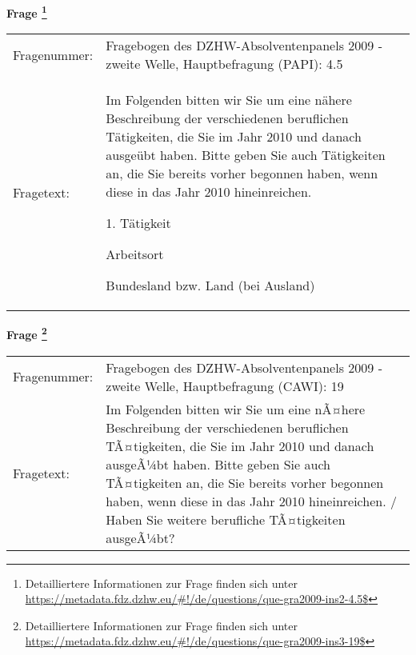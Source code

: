 				\vspace*{0.5cm}
                \noindent\textbf{Frage
	                \footnote{Detailliertere Informationen zur Frage finden sich unter
		              \url{https://metadata.fdz.dzhw.eu/\#!/de/questions/que-gra2009-ins2-4.5$}}}\\
				\begin{tabularx}{\hsize}{@{}lX}
					Fragenummer: &
					  Fragebogen des DZHW-Absolventenpanels 2009 - zweite Welle, Hauptbefragung (PAPI):
					  4.5
 \\
					Fragetext: & Im Folgenden bitten wir Sie um eine nähere Beschreibung der verschiedenen beruflichen Tätigkeiten, die Sie im Jahr 2010 und danach ausgeübt haben. Bitte geben Sie auch Tätigkeiten an, die Sie bereits vorher begonnen haben, wenn diese in das Jahr 2010 hineinreichen.\par  1. Tätigkeit\par  Arbeitsort\par  Bundesland bzw. Land (bei Ausland) \\
				\end{tabularx}
				\vspace*{0.5cm}
                \noindent\textbf{Frage
	                \footnote{Detailliertere Informationen zur Frage finden sich unter
		              \url{https://metadata.fdz.dzhw.eu/\#!/de/questions/que-gra2009-ins3-19$}}}\\
				\begin{tabularx}{\hsize}{@{}lX}
					Fragenummer: &
					  Fragebogen des DZHW-Absolventenpanels 2009 - zweite Welle, Hauptbefragung (CAWI):
					  19
 \\
					Fragetext: & Im Folgenden bitten wir Sie um eine nÃ¤here Beschreibung der verschiedenen beruflichen TÃ¤tigkeiten, die Sie im Jahr 2010 und danach ausgeÃ¼bt haben. Bitte geben Sie auch TÃ¤tigkeiten an, die Sie bereits vorher begonnen haben, wenn diese in das Jahr 2010 hineinreichen. / Haben Sie weitere berufliche TÃ¤tigkeiten ausgeÃ¼bt? \\
				\end{tabularx}





